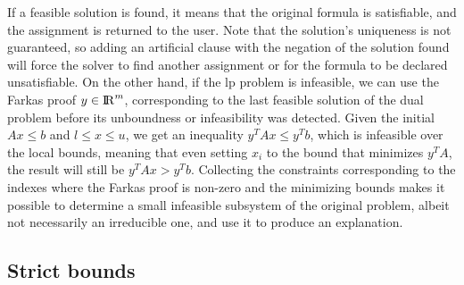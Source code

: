 \documentclass[runningheads]{llncs}
\begin{document}
If a feasible solution is found, it means that the original formula is satisfiable, and the assignment is returned to the user.
Note that the solution's uniqueness is not guaranteed, so adding an artificial clause with the negation of the solution found will force the solver to find another assignment or for the formula to be declared unsatisfiable.
On the other hand, if the \gls{lp} problem is infeasible, we can use the Farkas proof $y \in {\rm I\!R}^m$, corresponding to the last feasible solution of the dual problem before its unboundness or infeasibility was detected.
Given the initial $Ax \le b$ and $l \le x \le u$, we get an inequality $y^T A x \le y^T b$, which is infeasible over the local bounds, meaning that even setting $x_i$ to the bound that minimizes $y^T A$, the result will still be $y^T A x > y^T b$.
Collecting the constraints corresponding to the indexes where the Farkas proof is non-zero and the minimizing bounds makes it possible to determine a small infeasible subsystem of the original problem, albeit not necessarily an irreducible one, and use it to produce an explanation.

\subsection{Strict bounds}
\label{sec:strict-bounds}
\end{document}
